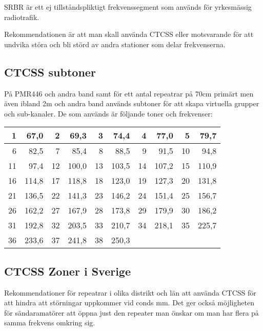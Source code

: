 SRBR är ett ej tillståndspliktigt frekvenssegment som används för yrkesmässig radiotrafik.

Rekommendationen är att man skall använda CTCSS eller motsvarande för att undvika störa och bli störd av andra stationer som delar frekvenserna.

\subsection{CTCSS subtoner}

På PMR446 och andra band samt för ett antal repeatrar på 70cm primärt men även ibland 2m och andra band används subtoner för att skapa virtuella grupper och sub-kanaler. De som används är följande toner och frekvenser:

\begin{tabular}{rr|rr|rr|rr|rr}
	 1 &  67,0 &  2 &  69,3 &  3 &  74,4 &  4 &  77,0 &  5 &  79,7 \\ \hline
	 6 &  82,5 &  7 &  85,4 &  8 &  88,5 &  9 &  91,5 & 10 &  94,8 \\ \hline
	11 &  97,4 & 12 & 100,0 & 13 & 103,5 & 14 & 107,2 & 15 & 110,9 \\ \hline
	16 & 114,8 & 17 & 118,8 & 18 & 123,0 & 19 & 127,3 & 20 & 131,8 \\ \hline
	21 & 136,5 & 22 & 141,3 & 23 & 146,2 & 24 & 151,4 & 25 & 156,7 \\ \hline
	26 & 162,2 & 27 & 167,9 & 28 & 173,8 & 29 & 179,9 & 30 & 186,2 \\ \hline
	31 & 192,8 & 32 & 203,5 & 33 & 210,7 & 34 & 218,1 & 35 & 225,7 \\ \hline
	36 & 233,6 & 37 & 241,8 & 38 & 250,3 &    &       &    &
\end{tabular}

\subsection{CTCSS Zoner i Sverige}

Rekommendationer för repeatrar i olika distrikt och län att använda CTCSS för att hindra att störningar uppkommer vid conds mm. Det ger också möjligheten för sändaramatörer att öppna just den repeater man önskar om man har flera på samma frekvens omkring sig.


